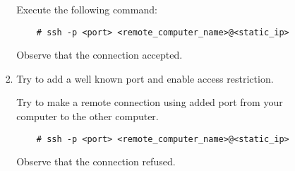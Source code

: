 \documentclass[a4paper,10pt]{article}
\begin{document}
\begin{enumerate}
\begin{enumerate}
\begin{enumerate}
\begin{enumerate}
                Execute the following command:
\begin{verbatim}
    # ssh -p <port> <remote_computer_name>@<static_ip>
\end{verbatim} 
                Observe that the connection accepted.

            \item Try to add a well known port and enable access restriction.
            	
                  Try to make a remote connection using added port from your computer to the other computer.
\begin{verbatim}
    # ssh -p <port> <remote_computer_name>@<static_ip>
\end{verbatim}

                    Observe that the connection refused. 
            \end{enumerate}
        \end{enumerate}
    \end{enumerate}
\end{enumerate}
\end{document}
